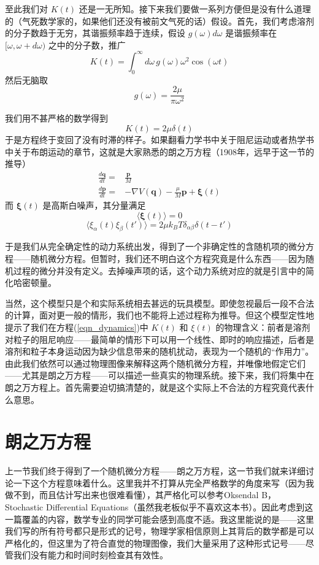 \documentclass{ctexart}
\begin{document}
至此我们对 $K(t)$ 还是一无所知。接下来我们要做一系列方便但是没有什么道理的（气死数学家的，如果他们还没有被前文气死的话）假设。首先，我们考虑溶剂的分子数趋于无穷，其谐振频率趋于连续，假设 $g(\omega)d\omega$ 是谐振频率在 $[\omega,\omega+d\omega)$ 之中的分子数，推广
\begin{equation}
K(t)=\int_0^\infty d\omega\,g(\omega)\omega^2\cos(\omega t)
\end{equation}
然后无脑取
\begin{equation}
g(\omega)=\frac{2\mu}{\pi\omega^2}
\end{equation}

我们用不甚严格的数学得到
\begin{equation}
K(t)=2\mu\delta(t)
\end{equation}
于是方程终于变回了没有时滞的样子。如果翻看力学书中关于阻尼运动或者热学书中关于布朗运动的章节，这就是大家熟悉的朗之万方程（1908年，远早于这一节的推导）
\begin{align} 
\frac{d\bm{q}}{dt}=&\frac{\bm{p}}{M}\\ 
\frac{d\bm{p}}{dt}=&-\nabla V(\bm{q})-\frac{\mu}{M}\bm{p}+\bm{\xi}(t) 
\end{align}
而 $\bm{\xi}(t)$ 是高斯白噪声，其分量满足
\begin{equation}
\langle\bm{\xi}(t)\rangle=0
\end{equation}
\begin{equation}
\langle\xi_\alpha(t)\xi_\beta(t')\rangle=2\mu k_BT\delta_{\alpha\beta}\delta(t-t')
\end{equation}

于是我们从完全确定性的动力系统出发，得到了一个非确定性的含随机项的微分方程——随机微分方程。但暂时，我们还不明白这个方程究竟是什么东西——因为随机过程的微分并没有定义。去掉噪声项的话，这个动力系统对应的就是引言中的简化哈密顿量。

当然，这个模型只是个和实际系统相去甚远的玩具模型。即使忽视最后一段不合法的计算，面对更一般的情形，我们也不能将上述过程称为推导。但这个模型定性地提示了我们在方程(\ref{eqn_dynamics})中 $K(t)$ 和 $\xi(t)$ 的物理含义：前者是溶剂对粒子的阻尼响应——最简单的情形下可以用一个线性、即时的响应描述，后者是溶剂和粒子本身运动因为缺少信息带来的随机扰动，表现为一个随机的“作用力”。由此我们依然可以通过物理图像来解释这两个随机微分方程，并唯像地假定它们——尤其是朗之万方程——可以描述一些真实的物理系统。接下来，我们将集中在朗之万方程上。首先需要迫切搞清楚的，就是这个实际上不合法的方程究竟代表什么意思。

\section{朗之万方程}
上一节我们终于得到了一个随机微分方程——朗之万方程，这一节我们就来详细讨论一下这个方程意味着什么。这里我并不打算从完全严格数学的角度来写（因为我做不到，而且估计写出来也很难看懂），其严格化可以参考Oksendal B，Stochastic Differential Equations（虽然我老板似乎不喜欢这本书）。因此考虑到这一篇覆盖的内容，数学专业的同学可能会感到高度不适。我这里能说的是——这里我们写的所有符号都只是形式的记号，物理学家相信原则上其背后的数学都是可以严格化的，但这里为了符合直觉的物理图像，我们大量采用了这种形式记号——尽管我们没有能力和时间时刻检查其有效性。
\end{document}
